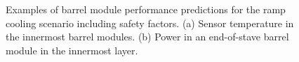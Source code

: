 \begin{figure}[t!]
\centering
{}\quad\quad
{}
\caption{Examples of barrel module performance predictions for the ramp cooling scenario including safety factors. (a) Sensor temperature in the innermost barrel modules. (b) Power in an end-of-stave barrel module in the innermost layer.}
\label{fig:modulerampperformance}
\end{figure}

